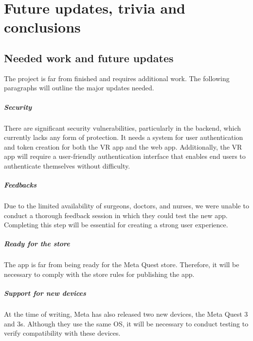 
\chapter{Future updates, trivia and conclusions}
\label{chp:conclusions}

\section{Needed work and future updates}
\label{chp:neededWork}
\noindent
The project is far from finished and requires additional work. The following paragraphs will outline the major updates needed.

\paragraph{Security}
There are significant security vulnerabilities, particularly in the backend, which currently lacks any form of protection. It needs a system for user authentication and token creation for both the \ac{VR} app and the web app.
Additionally, the \ac{VR} app will require a user-friendly authentication interface that enables end users to authenticate themselves without difficulty.

\paragraph{Feedbacks}
Due to the limited availability of surgeons, doctors, and nurses, we were unable to conduct a thorough feedback session in which they could test the new app. Completing this step will be essential for creating a strong user experience.

\paragraph{Ready for the store}
The app is far from being ready for the Meta Quest store. Therefore, it will be necessary to comply with the store rules for publishing the app.

\paragraph{Support for new devices}
At the time of writing, Meta has also released two new devices, the Meta Quest 3 and 3s. Although they use the same \ac{OS}, it will be necessary to conduct testing to verify compatibility with these devices.

